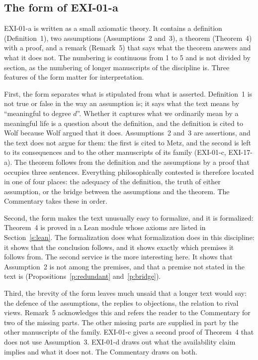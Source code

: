 \subsection{The form of EXI-01-a}

EXI-01-a is written as a small axiomatic theory. It contains a definition (Definition~1), two assumptions (Assumptions~2 and~3), a theorem (Theorem~4) with a proof, and a remark (Remark~5) that says what the theorem answers and what it does not. The numbering is continuous from 1 to 5 and is not divided by section, as the numbering of longer manuscripts of the discipline is. Three features of the form matter for interpretation.

First, the form separates what is stipulated from what is asserted. Definition~1 is not true or false in the way an assumption is; it says what the text means by \enquote{meaningful to degree $d$}. Whether it captures what we ordinarily mean by a meaningful life is a question about the definition, and the definition is cited to Wolf because Wolf argued that it does. Assumptions~2 and~3 are assertions, and the text does not argue for them: the first is cited to Metz, and the second is left to its consequences and to the other manuscripts of its family (EXI-01-c, EXI-17-a). The theorem follows from the definition and the assumptions by a proof that occupies three sentences. Everything philosophically contested is therefore located in one of four places: the adequacy of the definition, the truth of either assumption, or the bridge between the assumptions and the theorem. The Commentary takes these in order.

Second, the form makes the text unusually easy to formalize, and it is formalized: Theorem~4 is proved in a Lean module whose axioms are listed in Section~\ref{s:lean}. The formalization does what formalization does in this discipline: it shows that the conclusion follows, and it shows exactly which premises it follows from. The second service is the more interesting here. It shows that Assumption~2 is not among the premises, and that a premise not stated in the text is (Propositions~\ref{p:redundant} and~\ref{p:bridge}).

Third, the brevity of the form leaves much unsaid that a longer text would say: the defence of the assumptions, the replies to objections, the relation to rival views. Remark~5 acknowledges this and refers the reader to the Commentary for two of the missing parts. The other missing parts are supplied in part by the other manuscripts of the family. EXI-01-c gives a second proof of Theorem~4 that does not use Assumption~3. EXI-01-d draws out what the availability claim implies and what it does not. The Commentary draws on both.

